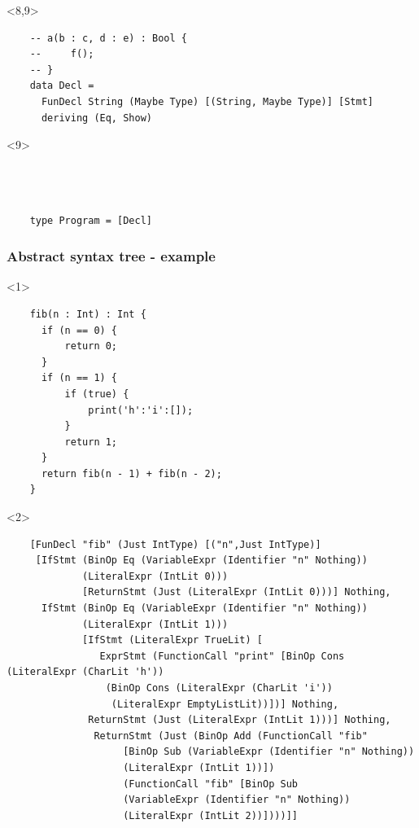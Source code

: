 \documentclass{beamer}
\begin{document}
\begin{frame}[fragile]
\begin{onlyenv}<8,9>
  \begin{verbatim}
    -- a(b : c, d : e) : Bool {
    --     f();
    -- }
    data Decl = 
      FunDecl String (Maybe Type) [(String, Maybe Type)] [Stmt]
      deriving (Eq, Show)
  \end{verbatim}
\end{onlyenv}
\begin{onlyenv}<9>
  \begin{verbatim} 



    type Program = [Decl] 
  \end{verbatim}
\end{onlyenv}



\end{frame}

\begin{frame}[fragile]
  \frametitle{Abstract syntax tree - example}
  \begin{onlyenv}<1>
  \begin{verbatim}
    fib(n : Int) : Int {
      if (n == 0) {
          return 0;
      }
      if (n == 1) {
          if (true) {
              print('h':'i':[]);
          }
          return 1;
      }
      return fib(n - 1) + fib(n - 2);
    }
  \end{verbatim}
  \end{onlyenv}

  \begin{onlyenv}<2>
  \begin{verbatim}
    [FunDecl "fib" (Just IntType) [("n",Just IntType)] 
     [IfStmt (BinOp Eq (VariableExpr (Identifier "n" Nothing)) 
             (LiteralExpr (IntLit 0))) 
             [ReturnStmt (Just (LiteralExpr (IntLit 0)))] Nothing,
      IfStmt (BinOp Eq (VariableExpr (Identifier "n" Nothing))
             (LiteralExpr (IntLit 1))) 
             [IfStmt (LiteralExpr TrueLit) [
                ExprStmt (FunctionCall "print" [BinOp Cons (LiteralExpr (CharLit 'h'))
                 (BinOp Cons (LiteralExpr (CharLit 'i'))
                  (LiteralExpr EmptyListLit))])] Nothing,
              ReturnStmt (Just (LiteralExpr (IntLit 1)))] Nothing,
               ReturnStmt (Just (BinOp Add (FunctionCall "fib"
                    [BinOp Sub (VariableExpr (Identifier "n" Nothing))
                    (LiteralExpr (IntLit 1))]) 
                    (FunctionCall "fib" [BinOp Sub 
                    (VariableExpr (Identifier "n" Nothing)) 
                    (LiteralExpr (IntLit 2))])))]]
  \end{verbatim}
\end{onlyenv}

\end{frame}
\end{document}
